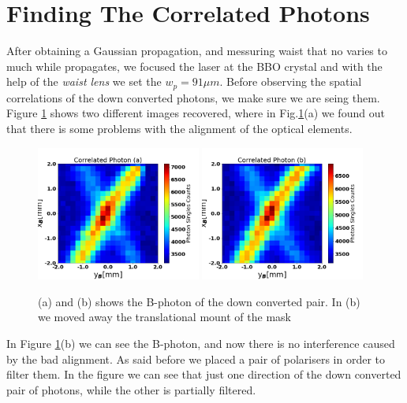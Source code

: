 \section{Finding The Correlated Photons}

After obtaining a Gaussian propagation, and messuring waist that no varies to much
while propagates, we focused the laser at the BBO crystal and with the help of the \textit{waist lens}
we set the $w_p=91 \mu m$. Before observing the spatial correlations of the down converted
photons, we make sure we are seing them. Figure \ref{fig:correlatedPhotonSpot} shows 
two different images recovered, where in Fig.\ref{fig:correlatedPhotonSpot}(a) we found
out that there is some problems with the alignment of the optical elements.



\begin{figure}[h!]
\centering
{  \includegraphics[width=0.48\textwidth]{Figures/correlatedPhotonSpot1.png} }
{  \includegraphics[width=0.48\textwidth]{Figures/correlatedPhotonSpot2.png} }
\caption{(a) and (b) shows the B-photon of the down converted pair. In (b) we moved away the translational mount of the mask}
 \label{fig:correlatedPhotonSpot}
\end{figure}

In Figure \ref{fig:correlatedPhotonSpot}(b) we can see the B-photon, and now there is
no interference caused by the bad alignment. As said before we placed a pair of polarisers
in order to filter them. In the figure we can see that just one direction of the 
down converted pair of photons,  while the other is partially filtered.


